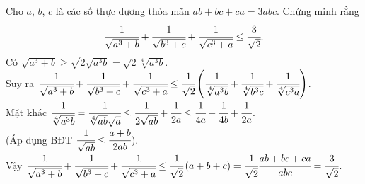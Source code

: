 \begin{ex}%
	Cho $ a $, $ b $, $ c $ là các số thực dương thỏa mãn $ ab+bc+ca=3abc $. Chứng minh rằng $$ \cfrac{1}{\sqrt{a^3+b}}+\cfrac{1}{\sqrt{b^3+c}}+\cfrac{1}{\sqrt{c^3+a}}\le \cfrac{3}{\sqrt{2}}.$$
		\loigiai
		{ Có
		$ \sqrt{a^3+b}\ge \sqrt{2\sqrt{a^3b}}=\sqrt{2}\sqrt[4]{a^3b}. $
		\\ Suy ra $ \cfrac{1}{\sqrt{a^3+b}}+\cfrac{1}{\sqrt{b^3+c}}+\cfrac{1}{\sqrt{c^3+a}} \le \cfrac{1}{\sqrt{2}}\left(\cfrac{1}{\sqrt[4]{a^3b}}+\cfrac{1}{\sqrt[4]{b^3c}}+\cfrac{1}{\sqrt[4]{c^3a}}\right) $.
		\\ Mặt khác $ \cfrac{1}{\sqrt[4]{a^3b}}=\cfrac{1}{\sqrt[4]{ab}\sqrt{a}}\le \cfrac{1}{2\sqrt{ab}}+\cfrac{1}{2a} \le \cfrac{1}{4a}+\cfrac{1}{4b}+\cfrac{1}{2a}$.
		\\(Áp dụng BĐT $ \cfrac{1}{\sqrt{ab}}\le \cfrac{a+b}{2ab} $).
		\\ Vậy $ \cfrac{1}{\sqrt{a^3+b}}+\cfrac{1}{\sqrt{b^3+c}}+\cfrac{1}{\sqrt{c^3+a}} \le \cfrac{1}{\sqrt{2}}\left(a+b+c\right) =\cfrac{1}{\sqrt{2}}\cfrac{ab+bc+ca}{abc}=\cfrac{3}{\sqrt{2}}$.
		}
	\end{ex}
	
